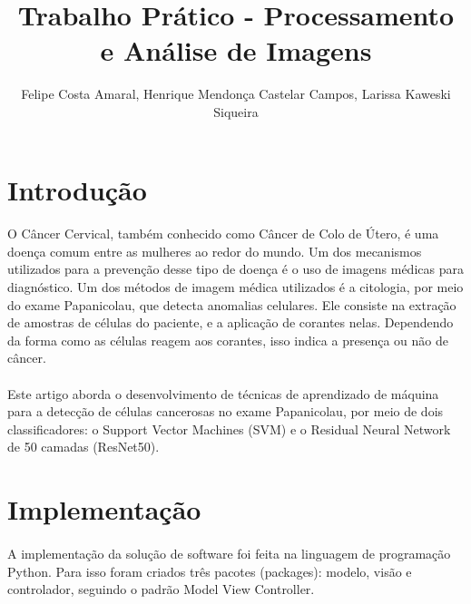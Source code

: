 \documentclass[12pt]{article}
\title{Trabalho Prático - Processamento e Análise de Imagens}
\author{Felipe Costa Amaral, Henrique Mendonça Castelar Campos, Larissa Kaweski Siqueira}
\begin{document}
 

\maketitle

\begin{abstract}
  
\end{abstract}
     
\begin{resumo} 
  
\end{resumo}


\section{Introdução}

\paragraph{}O Câncer Cervical, também conhecido como Câncer de Colo de Útero, é uma doença comum entre as mulheres ao redor do mundo. Um dos mecanismos utilizados para a prevenção desse tipo de doença é o uso de imagens médicas para diagnóstico. Um dos métodos de imagem médica utilizados é a citologia, por meio do exame Papanicolau, que detecta anomalias celulares. Ele consiste na extração de amostras de células do paciente, e a aplicação de corantes nelas. Dependendo da forma como as células reagem aos corantes, isso indica a presença ou não de câncer.

\paragraph{}Este artigo aborda o desenvolvimento de técnicas de aprendizado de máquina para a detecção de células cancerosas no exame Papanicolau, por meio de dois classificadores: o Support Vector Machines (SVM) e o Residual Neural Network de 50 camadas (ResNet50).

\section{Implementação}

\paragraph{}A implementação da solução de software foi feita na linguagem de programação Python. Para isso foram criados três pacotes (packages): modelo, visão e controlador, seguindo o padrão Model View Controller.
\end{document}
